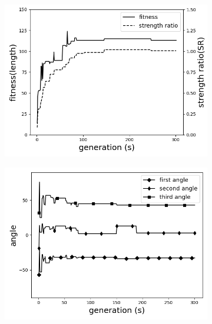 \begin{figure}[!t]
	\centering
		\begin{subfigure}[b]{0.8\linewidth}
			\includegraphics[width=\linewidth]{2020-11-10-pre-image/Three_distinct_angles_fitness_and_sr.png}
		\end{subfigure}

		\begin{subfigure}[b]{0.8\linewidth}
			\includegraphics[width=\linewidth]{2020-11-10-pre-image/three_distinct_angles_angle_change.png}
		\end{subfigure}


\end{figure}
